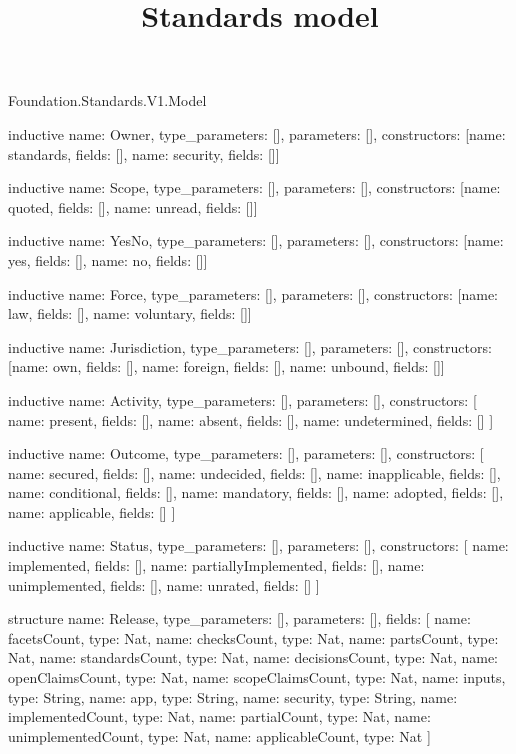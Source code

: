 \begin{lexlean}{Foundation.Standards.V1.Model}
\title{Standards model}
\begin{semanticmodule}
inductive{
  name: Owner,
  type_parameters: [],
  parameters: [],
  constructors: [{name: standards, fields: []}, {name: security, fields: []}]
}

inductive{
  name: Scope,
  type_parameters: [],
  parameters: [],
  constructors: [{name: quoted, fields: []}, {name: unread, fields: []}]
}

inductive{
  name: YesNo,
  type_parameters: [],
  parameters: [],
  constructors: [{name: yes, fields: []}, {name: no, fields: []}]
}

inductive{
  name: Force,
  type_parameters: [],
  parameters: [],
  constructors: [{name: law, fields: []}, {name: voluntary, fields: []}]
}

inductive{
  name: Jurisdiction,
  type_parameters: [],
  parameters: [],
  constructors: [{name: own, fields: []}, {name: foreign, fields: []}, {name: unbound, fields: []}]
}

inductive{
  name: Activity,
  type_parameters: [],
  parameters: [],
  constructors: [
    {name: present, fields: []},
    {name: absent, fields: []},
    {name: undetermined, fields: []}
  ]
}

inductive{
  name: Outcome,
  type_parameters: [],
  parameters: [],
  constructors: [
    {name: secured, fields: []},
    {name: undecided, fields: []},
    {name: inapplicable, fields: []},
    {name: conditional, fields: []},
    {name: mandatory, fields: []},
    {name: adopted, fields: []},
    {name: applicable, fields: []}
  ]
}

inductive{
  name: Status,
  type_parameters: [],
  parameters: [],
  constructors: [
    {name: implemented, fields: []},
    {name: partiallyImplemented, fields: []},
    {name: unimplemented, fields: []},
    {name: unrated, fields: []}
  ]
}

structure{
  name: Release,
  type_parameters: [],
  parameters: [],
  fields: [
    {name: facetsCount, type: Nat},
    {name: checksCount, type: Nat},
    {name: partsCount, type: Nat},
    {name: standardsCount, type: Nat},
    {name: decisionsCount, type: Nat},
    {name: openClaimsCount, type: Nat},
    {name: scopeClaimsCount, type: Nat},
    {name: inputs, type: String},
    {name: app, type: String},
    {name: security, type: String},
    {name: implementedCount, type: Nat},
    {name: partialCount, type: Nat},
    {name: unimplementedCount, type: Nat},
    {name: applicableCount, type: Nat}
  ]
}


\end{semanticmodule}
\end{lexlean}
